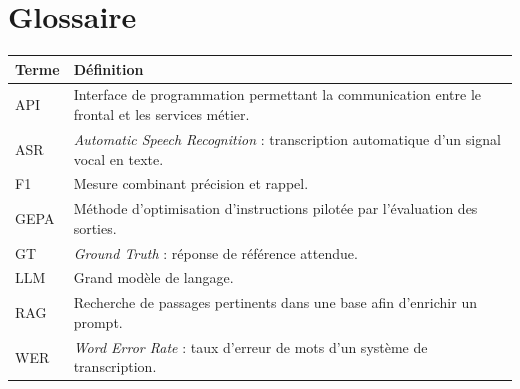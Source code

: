 \section*{Glossaire}
\begin{longtable}{p{}p{}}
\toprule
\textbf{Terme} & \textbf{Définition} \\
\midrule
API & Interface de programmation permettant la communication entre le frontal et les services métier. \\
ASR & \textit{Automatic Speech Recognition} : transcription automatique d'un signal vocal en texte. \\
F1 & Mesure combinant précision et rappel. \\
GEPA & Méthode d'optimisation d'instructions pilotée par l'évaluation des sorties. \\
GT & \textit{Ground Truth} : réponse de référence attendue. \\
LLM & Grand modèle de langage. \\
RAG & Recherche de passages pertinents dans une base afin d'enrichir un prompt. \\
WER & \textit{Word Error Rate} : taux d'erreur de mots d'un système de transcription. \\
\bottomrule
\end{longtable}
\newpage
